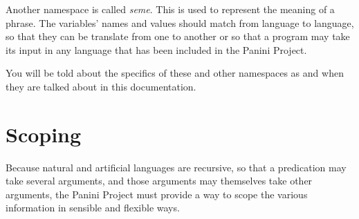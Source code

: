 \documentclass{article}
\begin{document}
Another namespace is called \emph{seme}. This is used to represent the 
meaning of a phrase. The variables' names and values should match from 
language to language, so that they can be translate from one to another
or so that a program may take its input in any language that has been
included in the Panini Project.

You will be told about the specifics of these and other namespaces as and when they are talked about in this documentation.

\section{Scoping} 
Because natural and artificial languages are 
recursive, so that a predication may take several arguments, and 
those arguments may themselves take other arguments, the Panini 
Project must provide a way to scope the various information in sensible and flexible ways.




\label{end}
\end{document}
